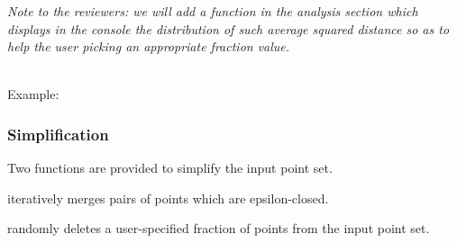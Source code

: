 \emph{Note to the reviewers: we will add a function in the analysis section which displays in the console the distribution of such average squared distance so as to help the user picking an appropriate fraction value.}

  \\


Example:



\subsubsection{Simplification}

Two functions are provided to simplify the input point set.

 iteratively merges pairs of points which are epsilon-closed.

 randomly deletes a user-specified fraction of points from the input point set.

  \\
  \\

